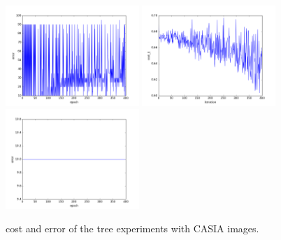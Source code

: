 \begin{figure}[htb]
\includegraphics[width=0.45\textwidth]{images/redes/ejecucion1/general_svm_casia/minidataset_tested_itself/error.png}
\includegraphics[width=0.45\textwidth]{images/redes/ejecucion1/general_svm_casia/minidataset_tested_iteself_lr_0_001/cost.png}
\includegraphics[width=0.45\textwidth]{images/redes/ejecucion1/general_svm_casia/minidataset_tested_iteself_lr_0_001/error.png}
\caption{cost and error of the tree experiments with CASIA images.} \label{fig:casia-ejec1}
\end{figure}

